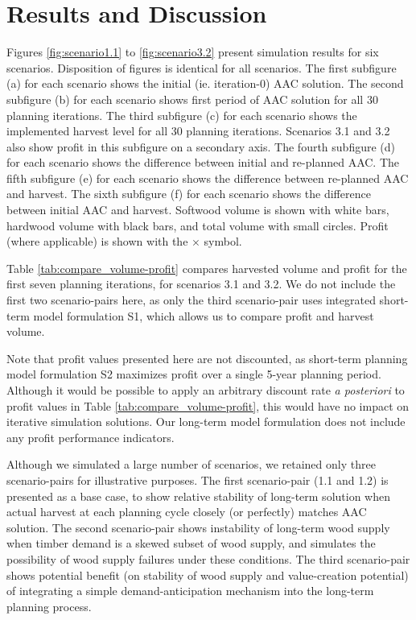 \section{Results and Discussion}
\label{sec:results1}

Figures \ref{fig:scenario1.1} to \ref{fig:scenario3.2} present
simulation results for six scenarios. %
Disposition of figures is identical for all scenarios. The
first subfigure (a) for each scenario shows the initial
(ie. iteration-0) AAC solution. The second subfigure (b) for each
scenario shows first period of AAC solution for all 30 planning
iterations. The third subfigure (c) for each scenario shows the
implemented harvest level for all 30 planning iterations. Scenarios
3.1 and 3.2 also show profit in this subfigure on a secondary
axis. The fourth subfigure (d) for each scenario shows the difference
between initial and re-planned AAC. The fifth subfigure (e) for each
scenario shows the difference between re-planned AAC and harvest.  The
sixth subfigure (f) for each scenario shows the difference between
initial AAC and harvest. Softwood volume is shown with white bars,
hardwood volume with black bars, and total volume with small
circles. Profit (where applicable) is shown with the $\times$
symbol. 

Table \ref{tab:compare_volume-profit} compares harvested volume and
profit for the first seven planning iterations, for scenarios 3.1 and
3.2. We do not include the first two scenario-pairs here, as only the
third scenario-pair uses integrated short-term model formulation S1,
which allows us to compare profit and harvest volume.

Note that profit values presented here are not discounted, as
short-term planning model formulation S2 maximizes profit over a
single 5-year planning period. Although it would be possible to apply
an arbitrary discount rate \emph{a posteriori} to profit values in
Table \ref{tab:compare_volume-profit}, this would have no impact on
iterative simulation solutions. Our long-term model formulation does
not include any profit performance indicators.

Although we simulated a large number of scenarios, we retained only
three scenario-pairs for illustrative purposes. The first
scenario-pair (1.1 and 1.2) is presented as a base case, to show
relative stability of long-term solution when actual harvest at each
planning cycle closely (or perfectly) matches AAC solution. The second
scenario-pair shows instability of long-term wood supply when timber
demand is a skewed subset of wood supply, and simulates the
possibility of wood supply failures under these conditions. The third
scenario-pair shows potential benefit (on stability of wood
supply and value-creation potential) of integrating a simple
demand-anticipation mechanism into the long-term planning process.

